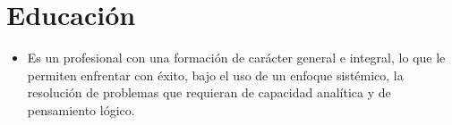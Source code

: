 \documentclass{my_cv}
\begin{document}
\makecvtitle
\vspace*{-1cm}

\section{Educaci\'on \faBook} 
\begin{itemize}
\item Es un profesional con una formación de carácter general e integral, lo que le permiten enfrentar con éxito, bajo el uso de un enfoque sist\'emico, la resolución de problemas que requieran de capacidad analítica y de pensamiento l\'ogico.
\end{itemize}
\end{document}
